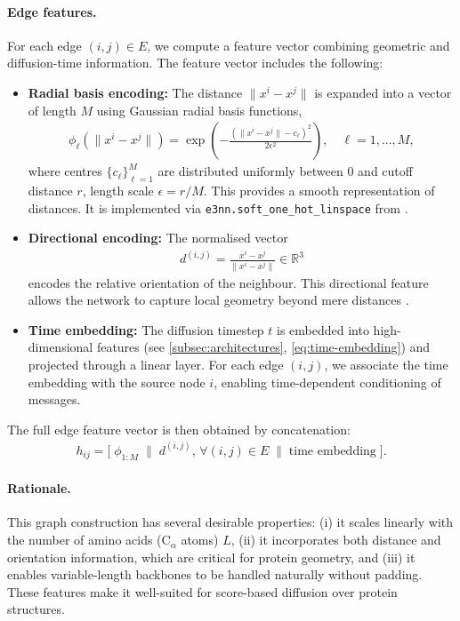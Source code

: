 \documentclass[a4paper,12pt]{article}
\begin{document}
\paragraph{Edge features.}
For each edge \((i,j) \in E\), we compute a feature vector combining geometric and diffusion-time information. The feature vector includes the following:
\begin{itemize}
    \item \textbf{Radial basis encoding:} The distance \(\|x^i - x^j\|\) is expanded into a vector of length \(M\) using Gaussian radial basis functions,
        \begin{align*}
            \phi_\ell(\|x^i - x^j\|) = \exp\!\left(-\frac{(\|x^i - x^j\|-c_\ell)^2}{2\epsilon^2}\right),\quad \ell=1,...,M,
        \end{align*}
        where centres \(\{c_\ell\}_{\ell=1}^M\) are distributed uniformly between \(0\) and cutoff distance \(r\), length scale \(\epsilon=r/M\). This provides a smooth representation of distances. It is implemented via \texttt{e3nn.soft\_one\_hot\_linspace} from \citet{geiger2022E3nnEuclideanNeural,geiger2025EuclideanNeuralNetworks}.
    \item \textbf{Directional encoding:} The normalised vector
        \begin{align*}
            d^{\left(i,j\right)} = \frac{x^i - x^j}{\|x^i - x^j\|}\in \mathbb{R}^{3}
        \end{align*}
        encodes the relative orientation of the neighbour. This directional feature allows the network to capture local geometry beyond mere distances \citep{watsonNovoDesignProtein2023}.
    \item \textbf{Time embedding:} The diffusion timestep \(t\) is embedded into high-dimensional features (see \cref{subsec:architectures}, \cref{eq:time-embedding}) and projected through a linear layer. For each edge \((i,j)\), we associate the time embedding with the source node \(i\), enabling time-dependent conditioning of messages.
\end{itemize}
The full edge feature vector is then obtained by concatenation:
\begin{align*}
    h_{ij} = \big[ \;\phi_{1:M} \;\|\; d^{\left(i,j\right)},\,\forall \left(i,j\right)\in E \;\|\; \text{time embedding} \;\big].
\end{align*}

\paragraph{Rationale.}
This graph construction has several desirable properties: (i) it scales linearly with the number of amino acids (C\(_\alpha\) atoms) \(L\), (ii) it incorporates both distance and orientation information, which are critical for protein geometry, and (iii) it enables variable-length backbones to be handled naturally without padding. These features make it well-suited for score-based diffusion over protein structures.
\end{document}
